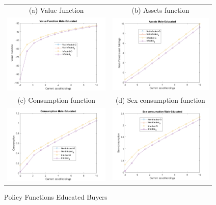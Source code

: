 \begin{figure}[H]
\caption{Policy Functions Educated Buyers}
\hspace{-2.0cm}
\begin{center}
\begin{tabular}{cc}
\multicolumn{1}{c}{(a) Value function} &  
\multicolumn{1}{c}{(b) Assets function} \\
\includegraphics[angle=0,width=.5\textwidth]{figures/FIG1.png}   & 
\includegraphics[angle=0,width=.5\textwidth]{figures/FIG3.png} \\
\multicolumn{1}{c}{(c) Consumption function} &  
\multicolumn{1}{c}{(d) Sex consumption function } \\
\includegraphics[angle=0,width=.5\textwidth]{figures/FIG2.png}   & 
\includegraphics[angle=0,width=.5\textwidth]{figures/FIG4.png} \\
\end{tabular}
\end{center}
\label{fig:2}
\end{figure}

